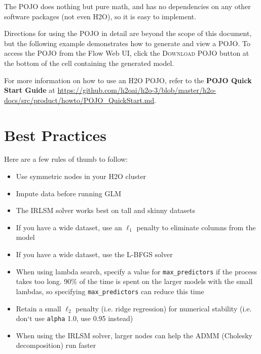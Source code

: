 The POJO does nothing but pure math, and has no dependencies on any other software packages (not even H2O),
so it is easy to implement.

Directions for using the POJO in detail are beyond the scope of this document, but the following example demonstrates how to generate and view a POJO.  To access the POJO from the Flow Web UI, click the \textsc{Download POJO} button at the bottom of the cell containing the generated model.

For more information on how to use an H2O POJO, refer to the \textbf{POJO Quick Start Guide} at {\url{https://github.com/h2oai/h2o-3/blob/master/h2o-docs/src/product/howto/POJO_QuickStart.md}}. 

\waterExampleInR

\newpage
\waterExampleInPython



\section{Best Practices}

Here are a few rules of thumb to follow:

\begin{itemize}
\item Use symmetric nodes in your H2O cluster
\item Impute data before running GLM
\item The IRLSM solver works best on tall and skinny datasets
\item If you have a wide dataset, use an  $\ell_1$ penalty to eliminate columns from the model
\item If you have a wide dataset, use the L-BFGS solver
\item When using lambda search, specify a value for \texttt{max\_predictors} if the process takes too long. 90\% of the time is spent on the larger models with the small lambdas, so specifying \texttt{max\_predictors} can reduce this time
\item Retain a small  $\ell_2$ penalty (i.e. ridge regression) for numerical stability (i.e. don`t use \texttt{alpha} 1.0, use 0.95 instead)
\item When using the IRLSM solver, larger nodes can help the ADMM (Cholesky decomposition) run faster
\end{itemize}

